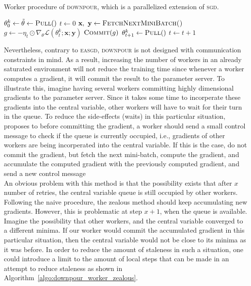 \begin{algorithm}[H]
  \caption{Worker procedure of \textsc{downpour}, which is a parallelized extension of \textsc{sgd}.}
  \label{algo:downpour_worker}
  \begin{algorithmic}[1]
    \State $\theta^k_0 \gets \tilde{\theta} \gets \Call{Pull}$
    \State $t \gets 0$
    \State $\textbf{x},~\textbf{y} \gets \Call{FetchNextMiniBatch()}{}$
    \State $g \gets -\eta_t \odot \nabla_\theta \mathcal{L}(\theta^k_t;\textbf{x};\textbf{y})$
    \State $\Call{Commit}{g}$
    \State $\theta^k_{t + 1} \gets \Call{Pull}$
    \State $t \gets t + 1$
    \EndWhile
    \EndProcedure
  \end{algorithmic}
\end{algorithm}

Nevertheless, contrary to \textsc{easgd}, \textsc{downpour} is not designed with communication constraints in mind. As a result, increasing the number of workers in an already saturated environment will not reduce the training time since whenever a worker computes a gradient, it will commit the result to the parameter server. To illustrate this, imagine having several workers committing highly dimensional gradients to the parameter server. Since it takes some time to incorperate these gradients into the central variable, other workers will have to wait for their turn in the queue. To reduce the side-effects (waits) in this particular situation,~\cite{louppe2010zealous} proposes to before committing the gradient, a worker should send a small control message to check if the queue is currently occupied, i.e., gradients of other workers are being incorperated into the central variable. If this is the case, do not commit the gradient, but fetch the next mini-batch, compute the gradient, and accumulate the computed gradient with the previously computed gradient, and send a new control message\\

An obvious problem with this method is that the possibility exists that after $x$ number of retries, the central variable queue is still occupied by other workers. Following the naive procedure, the zealous method should keep accumulating new gradients. However, this is problematic at step $x + 1$, when the queue is available. Imagine the possibility that other workers, and the central variable converged to a different minima. If our worker would commit the accumulated gradient in this particular situation, then the central variable would not be close to its minima as it was before. In order to reduce the amount of staleness in such a situation, one could introduce a limit to the amount of local steps that can be made in an attempt to reduce staleness as shown in Algorithm~\ref{algo:downpour_worker_zealous}.\\

